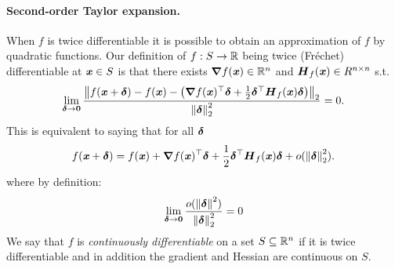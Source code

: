


\paragraph{Second-order Taylor expansion.}  When $f$ is twice differentiable it is possible to obtain an approximation of $f$ by quadratic functions.
Our definition of $f:S\rightarrow \R$ being twice (Fr\'{e}chet) differentiable at
$\xx \in S$ is that there exists $\grad f(\xx) \in \R^n$ and
$\HH_f(\xx) \in R^{n \times n}$ s.t.
\begin{displaymath}
  \lim_{\ddelta \to \veczero}
  \frac{\norm{f(\xx+\ddelta) -f(\xx)
      -\left( \grad f(\xx)^{\trp} \ddelta + \frac{1}{2}\ddelta^\trp
        \HH_f(\xx) \ddelta \right) }_2}{
    \norm{\ddelta}_2^2
  } = 0
    .
\end{displaymath}
This is equivalent to saying that for all $\ddelta$
\begin{displaymath}
  f(\xx+\ddelta) = f(\xx) + \grad f(\xx)^\trp \ddelta + \frac{1}{2}\ddelta^\trp  \HH_f(\xx) \ddelta + o(\norm{\ddelta}_2^2).
\end{displaymath}
where by definition:
\begin{displaymath}
  \lim_{\ddelta \rightarrow \veczero} \frac{o(\norm{\ddelta}^2)}{\norm{\ddelta}_2^2} = 0
\end{displaymath}
We say that $f$ is \emph{ continuously differentiable} on a set $S \subseteq \R^n $ if it is
twice differentiable and in addition the gradient and Hessian are continuous on $S$.

